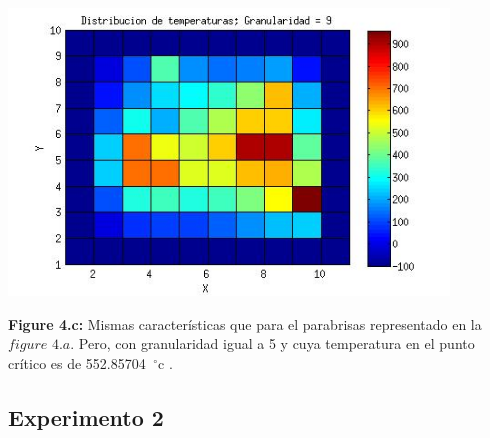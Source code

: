 \includegraphics[width=\textwidth,height=3.0in,keepaspectratio
]{82x71h9.jpg} \newline
\begin {flushleft}
\textbf{Figure 4.c:} Mismas características que para el parabrisas representado en la $figure$ $4.a$. Pero, con granularidad igual a 5 y cuya temperatura en el punto crítico es de 552.85704\hspace{-1.5mm}$\phantom{a}^{\circ}$c .
\end{flushleft}








\subsection{Experimento 2}
